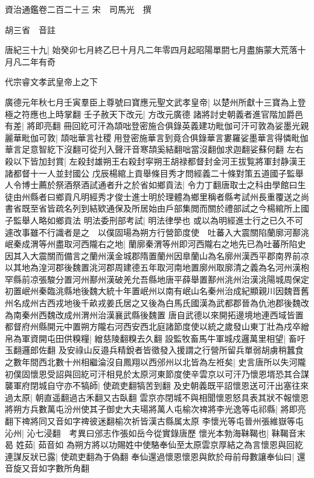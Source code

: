 資治通鑑卷二百二十三
宋　司馬光　撰

胡三省　音註

唐紀三十九|{
	始癸卯七月終乙巳十月凡二年零四月起昭陽單閼七月盡旃蒙大荒落十月凡二年有奇}


代宗睿文孝武皇帝上之下

廣德元年秋七月壬寅羣臣上尊號曰寶應元聖文武孝皇帝|{
	以楚州所獻十三寶為上登極之符應也上時掌翻}
壬子赦天下改元|{
	方改元廣德}
諸將討史朝義者進官階加爵邑有差|{
	將即亮翻}
冊回紇可汗為頡咄登密施合俱錄英義建功毗伽可汗可敦為娑墨光親麗華毗伽可敦|{
	頡咄華言社稷用登密施華言到竟合俱錄華言婁羅娑墨華言得憐毗伽華言足意智紇下沒翻可從刋入聲汗音寒頡奚結翻咄當沒翻伽求迦翻娑蘇何翻}
左右殺以下皆加封賞|{
	左殺封雄朔王右殺封寜朔王胡禄都督封金河王拔覧將軍封静漢王諸都督十一人並封國公}
戊辰楊綰上貢舉條目秀才問經義二十條對策五道國子監舉人令博士薦於祭酒祭酒試通者升之於省如鄉貢法|{
	令力丁翻唐取士之科由學館曰生徒由州縣者曰鄉貢凡明經秀才俊士進士明於理體為鄉里稱者縣考試州長重覆送之尚書省既至省皆疏名列到結欵通保及所居始由戶部集閲而關於禮部試之今楊綰所上國子監舉人略如鄉貢法}
明法委刑部考試|{
	明法律學也}
或以為明經進士行之已久不可遽改事雖不行識者是之　以僕固瑒為朔方行營節度使　吐蕃入大震關陷蘭廓河鄯洮岷秦成渭等州盡取河西隴右之地|{
	蘭廓秦渭等州即河西隴右之地先已為吐蕃所陷史因其入大震關而備言之蘭州漢金城郡隋置蘭州因臯蘭山為名廓州漢西平郡南界前凉以其地為湟河郡後魏置洮河郡周建德五年取河南地置廓州取廓清之義為名河州漢枹罕縣前凉張駿分置河州鄯州漢破羌允吾縣地唐平薛舉置鄯州洮州治漢洮陽城周保定初置岷州秦臨洮縣地後魏大統十年置岷州以南有岷山名秦州治成紀顯親川因魏晋舊州名成州古西戎地後千畝戎姜氏居之又後為白馬氏國漢為武都郡晉為仇池郡後魏改為南秦州西魏改成州渭州治漢襄武縣後魏置}
唐自武德以來開拓邊境地連西域皆置都督府州縣開元中置朔方隴右河西安西北庭諸節度使以統之歲發山東丁壯為戍卒繒帛為軍資開屯田供糗糧|{
	繒慈陵翻糗去久翻}
設監牧畜馬牛軍城戍邏萬里相望|{
	畜吁玉翻邏郎佐翻}
及安祿山反邉兵精銳者皆徵發入援謂之行營所留兵單弱胡虜稍蠶食之數年間西北數十州相繼淪沒自鳳翔以西邠州以北皆為左袵矣|{
	史言唐所以失河隴}
初僕固懷恩受詔與回紇可汗相見於太原河東節度使辛雲京以可汗乃懷恩壻恐其合謀襲軍府閉城自守亦不犒師|{
	使疏吏翻犒苦到翻}
及史朝義既平詔懷恩送可汗出塞往來過太原|{
	朝直遥翻過古禾翻又古臥翻}
雲京亦閉城不與相聞懷恩怒具表其狀不報懷恩將朔方兵數萬屯汾州使其子御史大夫瑒將萬人屯榆次禆將李光逸等屯祁縣|{
	將即亮翻下禆將同又音如字禆彼迷翻榆次祈皆漢古縣属太原}
李懷光等屯晉州張維嶽等屯沁州|{
	沁七浸翻　考異曰邠志作張如岳今從實錄唐歷}
懷光本勃海靺鞨也|{
	靺鞨音末曷}
姓茹|{
	茹音如}
為朔方將以功賜姓中使駱奉仙至太原雲京厚結之為言懷恩與回紇連謀反狀已露|{
	使疏吏翻為于偽翻}
奉仙還過懷恩懷恩與飲於母前母數讓奉仙曰|{
	還音旋又音如字數所角翻}
